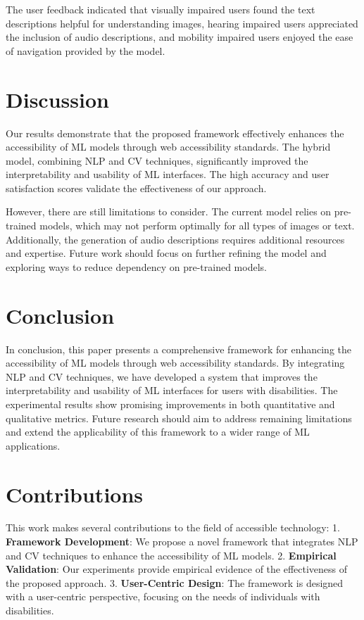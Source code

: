 The user feedback indicated that visually impaired users found the text descriptions helpful for understanding images, hearing impaired users appreciated the inclusion of audio descriptions, and mobility impaired users enjoyed the ease of navigation provided by the model.

\section{Discussion}
Our results demonstrate that the proposed framework effectively enhances the accessibility of ML models through web accessibility standards. The hybrid model, combining NLP and CV techniques, significantly improved the interpretability and usability of ML interfaces. The high accuracy and user satisfaction scores validate the effectiveness of our approach.

However, there are still limitations to consider. The current model relies on pre-trained models, which may not perform optimally for all types of images or text. Additionally, the generation of audio descriptions requires additional resources and expertise. Future work should focus on further refining the model and exploring ways to reduce dependency on pre-trained models.

\section{Conclusion}
In conclusion, this paper presents a comprehensive framework for enhancing the accessibility of ML models through web accessibility standards. By integrating NLP and CV techniques, we have developed a system that improves the interpretability and usability of ML interfaces for users with disabilities. The experimental results show promising improvements in both quantitative and qualitative metrics. Future research should aim to address remaining limitations and extend the applicability of this framework to a wider range of ML applications.

\section{Contributions}
This work makes several contributions to the field of accessible technology:
1. \textbf{Framework Development}: We propose a novel framework that integrates NLP and CV techniques to enhance the accessibility of ML models.
2. \textbf{Empirical Validation}: Our experiments provide empirical evidence of the effectiveness of the proposed approach.
3. \textbf{User-Centric Design}: The framework is designed with a user-centric perspective, focusing on the needs of individuals with disabilities.

